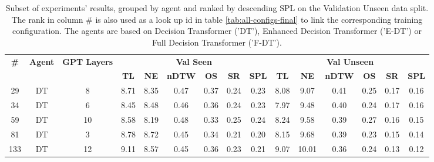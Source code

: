\begin{table}
\centering
\caption{\label{tab:layers}Subset of experiments' results, grouped by agent and ranked by descending SPL on the Validation Unseen data split. The rank in column \# is also used as a look up id in table \ref{tab:all-configs-final} to link the corresponding training configuration.     \newline The agents are based on Decision Transformer ('DT'), Enhanced Decision Transformer ('E-DT') or Full Decision Transformer ('F-DT').}
\begin{tabular}{@{\hskip3pt}c@{\hskip3pt}c@{\hskip3pt}c@{\hskip3pt}c@{\hskip3pt}c@{\hskip3pt}c@{\hskip3pt}c@{\hskip3pt}c@{\hskip3pt}c@{\hskip3pt}c@{\hskip3pt}c@{\hskip3pt}c@{\hskip3pt}c@{\hskip3pt}c@{\hskip3pt}c}
\toprule
\textbf{\#} & \textbf{Agent} & \textbf{GPT Layers} & \multicolumn{6}{c}{\textbf{Val Seen}} & \multicolumn{6}{c}{\textbf{Val Unseen}} \\
 \cmidrule(l){4-9} \cmidrule(l){10-15} \textbf{~} &     \textbf{~} &          \textbf{~} &       \textbf{TL} & \textbf{NE} & \textbf{nDTW} & \textbf{OS} & \textbf{SR} & \textbf{SPL} &         \textbf{TL} & \textbf{NE} & \textbf{nDTW} & \textbf{OS} & \textbf{SR} & \textbf{SPL} \\
\midrule
         29 &             DT &                   8 &              8.71 &        8.35 &          0.47 &        0.37 &        0.24 &         0.23 &                8.08 &        9.07 &          0.41 &        0.25 &        0.17 &         0.16 \\
         34 &             DT &                   6 &              8.45 &        8.48 &          0.46 &        0.36 &        0.24 &         0.23 &                7.97 &        9.48 &          0.40 &        0.24 &        0.17 &         0.16 \\
         59 &             DT &                  10 &              8.58 &        8.19 &          0.48 &        0.33 &        0.25 &         0.24 &                8.24 &        9.58 &          0.39 &        0.27 &        0.16 &         0.15 \\
         81 &             DT &                   3 &              8.78 &        8.72 &          0.45 &        0.34 &        0.21 &         0.20 &                8.15 &        9.68 &          0.39 &        0.23 &        0.15 &         0.14 \\
        133 &             DT &                  12 &              9.11 &        8.57 &          0.45 &        0.36 &        0.23 &         0.21 &                9.07 &       10.01 &          0.36 &        0.24 &        0.13 &         0.12 \\

\end{tabular}
\end{table}
